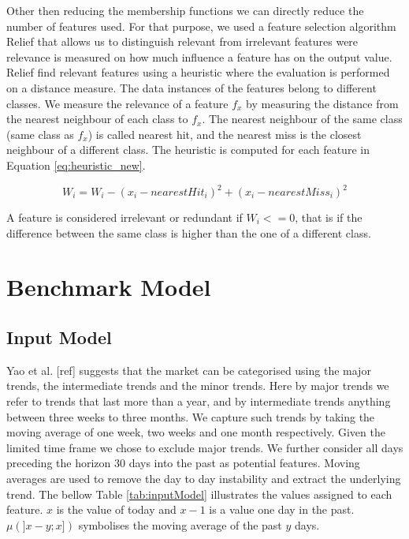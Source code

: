 Other then reducing the membership functions we can directly reduce the number of features used. For that purpose, we used a feature selection algorithm Relief that allows us to distinguish relevant from irrelevant features were relevance is measured on how much influence a feature has on the output value. Relief \cite{kira92} \cite{kono94} \cite{Robnik97} find relevant features using a heuristic where the evaluation is performed on a distance measure. The data instances of the features belong to different classes. We measure the relevance of a feature $f_x$ by measuring the distance from the nearest neighbour of each class to $f_x$. The nearest neighbour of the same class (same class as $f_x$) is called nearest hit, and the nearest miss is the closest neighbour of a different class.  The heuristic is computed for each feature in Equation \ref{eq:heuristic_new}.

\begin{equation} \label{eq:heuristic_new}
W_i = W_i  - (x_i - nearestHit_i)^2 + (x_i - nearestMiss_i)^2
\end{equation}

A feature is considered irrelevant or redundant if $W_i <= 0$, that is if the difference between the same class is higher than the one of a different class.  


\section{Benchmark Model}

\subsection{Input Model}

Yao et al. [ref] suggests that the market can be categorised using the major trends, the intermediate trends and the minor trends. 
Here by major trends we refer to trends that last more than a year, and by intermediate trends anything between three weeks to three months. We capture such trends by taking the moving average of one week, two weeks and one month respectively. Given the limited time frame we chose to exclude major trends. We further consider all days preceding the horizon 30 days into the past as potential features. Moving averages are used to remove the day to day instability and extract the underlying trend\cite{armstrong01}. The bellow Table \ref{tab:inputModel} illustrates the values assigned to each feature. $x$ is the value of today and $x-1$ is a value one day in the past. $\mu(]x-y;x])$ symbolises the moving average of the past $y$ days. 


